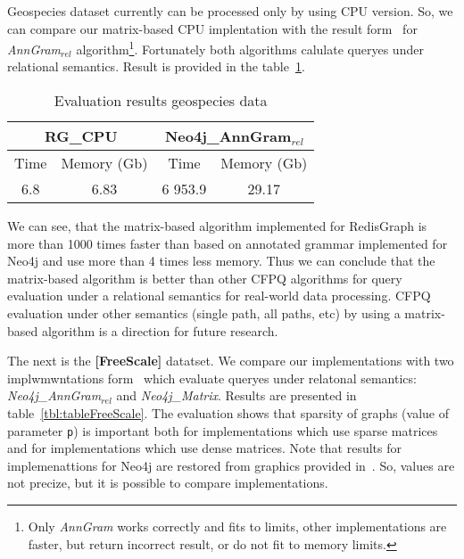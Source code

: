 Geospecies dataset currently can be processed only by using CPU version.
So, we can compare our matrix-based CPU implentation with the result form~\cite{Kuijpers:2019:ESC:3335783.3335791} for \textit{AnnGram$_{\textit{rel}}$} algorithm\footnote{Only \textit{AnnGram} works correctly and fits to limits, other implementations are faster, but return incorrect result, or do not fit to memory limits.}.
Fortunately both algorithms calulate queryes under relational semantics.
Result is provided in the table~\ref{tbl:geo}.

{\setlength{\tabcolsep}{0.4em}
\begin{table}[H]
\caption{Evaluation results geospecies data}
\label{tbl:geo}
\begin{tabular}{| c | c | c | c | }
    \hline
     \multicolumn{2}{|c|}{RG\_CPU}     & \multicolumn{2}{|c|}{Neo4j\_AnnGram$_{rel}$}          \\
     \hline
     Time  & Memory (Gb)  & Time  & Memory (Gb)   \\
    \hline
    \hline
    6.8   & 6.83    & 6 953.9  & 29.17   \\
    \hline
\end{tabular}
\end{table}
}

We can see, that the matrix-based algorithm implemented for RedisGraph is more than 1000 times faster than based on annotated grammar implemented for Neo4j and use more than 4 times less memory.
Thus we can conclude that the matrix-based algorithm is better than other CFPQ algorithms for query evaluation under a relational semantics for real-world data processing.
CFPQ evaluation under other semantics (single path, all paths, etc) by using a matrix-based algorithm is a direction for future research.

The next is the \textbf{[FreeScale]} datatset.
We compare our implementations with two implwmwntations form~\cite{Kuijpers:2019:ESC:3335783.3335791} which evaluate queryes under relatonal semantics: \textit{Neo4j\_AnnGram${_\textit{rel}}$} and \textit{Neo4j\_Matrix}. Results are presented in table~\ref{tbl:tableFreeScale}.
The evaluation shows that sparsity of graphs (value of parameter \texttt{p}) is important both for implementations which use sparse matrices and for implementations which use dense matrices.
Note that results for implemenattions for Neo4j are restored from graphics provided in~\cite{Kuijpers:2019:ESC:3335783.3335791}.
So, values are not precize, but it is possible to compare implementations.

